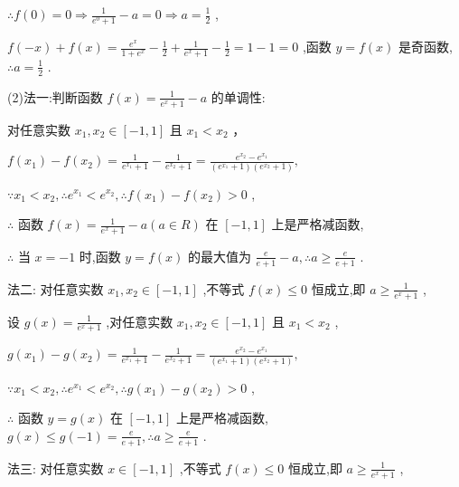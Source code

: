 \documentclass[10pt]{article}
\begin{document}
\(\therefore f\left( 0\right)  = 0 \Rightarrow  \frac{1}{{e}^{0} + 1} - a = 0 \Rightarrow  a = \frac{1}{2}\) ,

\(f\left( {-x}\right)  + f\left( x\right)  = \frac{{e}^{x}}{1 + {e}^{x}} - \frac{1}{2} + \frac{1}{{e}^{x} + 1} - \frac{1}{2} = 1 - 1 = 0\) ,函数 \(y = f\left( x\right)\) 是奇函数, \(\therefore a = \frac{1}{2}\) .

(2)法一:判断函数 \(f\left( x\right)  = \frac{1}{{e}^{x} + 1} - a\) 的单调性:

对任意实数 \({x}_{1},{x}_{2} \in  \left\lbrack  {-1,1}\right\rbrack\) 且 \({x}_{1} < {x}_{2}\) ，

\(f\left( {x}_{1}\right)  - f\left( {x}_{2}\right)  = \frac{1}{{e}^{{x}_{1}} + 1} - \frac{1}{{e}^{{x}_{2}} + 1} = \frac{{e}^{{x}_{2}} - {e}^{{x}_{1}}}{\left( {{e}^{{x}_{1}} + 1}\right) \left( {{e}^{{x}_{2}} + 1}\right) },\)

\(\because {x}_{1} < {x}_{2},\therefore {e}^{{x}_{1}} < {e}^{{x}_{2}},\therefore f\left( {x}_{1}\right)  - f\left( {x}_{2}\right)  > 0\) ,

\(\therefore\) 函数 \(f\left( x\right)  = \frac{1}{{e}^{x} + 1} - a\left( {a \in  R}\right)\) 在 \(\left\lbrack  {-1,1}\right\rbrack\) 上是严格减函数,

\(\therefore\) 当 \(x =  - 1\) 时,函数 \(y = f\left( x\right)\) 的最大值为 \(\frac{e}{e + 1} - a,\therefore a \geq  \frac{e}{e + 1}\) .

法二: 对任意实数 \({x}_{1},{x}_{2} \in  \left\lbrack  {-1,1}\right\rbrack\) ,不等式 \(f\left( x\right)  \leq  0\) 恒成立,即 \(a \geq  \frac{1}{{e}^{x} + 1}\) ,

设 \(g\left( x\right)  = \frac{1}{{e}^{x} + 1}\) ,对任意实数 \({x}_{1},{x}_{2} \in  \left\lbrack  {-1,1}\right\rbrack\) 且 \({x}_{1} < {x}_{2}\) ,

\(g\left( {x}_{1}\right)  - g\left( {x}_{2}\right)  = \frac{1}{{e}^{{x}_{1}} + 1} - \frac{1}{{e}^{{x}_{2}} + 1} = \frac{{e}^{{x}_{2}} - {e}^{{x}_{1}}}{\left( {{e}^{{x}_{1}} + 1}\right) \left( {{e}^{{x}_{2}} + 1}\right) },\)

\(\because {x}_{1} < {x}_{2},\therefore {e}^{{x}_{1}} < {e}^{{x}_{2}},\therefore g\left( {x}_{1}\right)  - g\left( {x}_{2}\right)  > 0\) ,

\(\therefore\) 函数 \(y = g\left( x\right)\) 在 \(\left\lbrack  {-1,1}\right\rbrack\) 上是严格减函数, \(g\left( x\right)  \leq  g\left( {-1}\right)  = \frac{e}{e + 1},\therefore a \geq  \frac{e}{e + 1}\) .

法三: 对任意实数 \(x \in  \left\lbrack  {-1,1}\right\rbrack\) ,不等式 \(f\left( x\right)  \leq  0\) 恒成立,即 \(a \geq  \frac{1}{{e}^{x} + 1}\) ,
\end{document}
